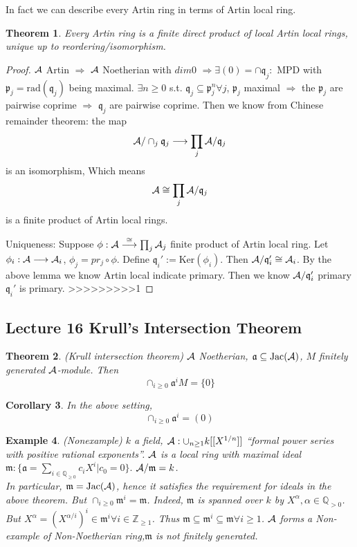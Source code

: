 \documentclass[11pt]{article}
\newtheorem{thm}{Theorem}[section]
\newtheorem{cor}[thm]{Corollary}
\newtheorem{ex}[thm]{Example}
\newcommand{\intg}{\mathbb Z}
\newcommand{\ratl}{\mathbb Q}
\newcommand{\sca}{{\mathfrak a}}
\newcommand{\scm}{{\mathfrak m}}
\newcommand{\scp}{{\mathfrak p}}
\newcommand{\scq}{\mathfrak q}
\newcommand{\cala}{{\cal A}}
\newcommand{\Lrta}{\Longrightarrow}
\newcommand{\lrta}{\longrightarrow}
\begin{document}
In fact we can describe every Artin ring in terms of Artin local ring.
\begin{thm}\label{thm:Artin_product_of_Artin_local}
Every Artin ring is a finite direct product of local Artin local rings, unique up to reordering/isomorphism.
\end{thm}
\begin{proof}
$\cala$ Artin $\Lrta $ $\cala$ Noetherian with $dim 0$ $\Lrta\exists (0)=\cap\scq_j:$ MPD with $\scp_j=\text{rad}(\scq_j)$ being maximal. $\exists n\geq 0$  s.t. $\scq_j\subseteq \scp_j^n\forall j$, $\scp_j$ maximal $\Lrta$ the $\scp_j$ are pairwise coprime $\Lrta$ $\scq_j$ are pairwise coprime. Then we know from Chinese remainder theorem:
the map
$$
\cala/\cap_j\scq_j\lrta \prod_j \cala/\scq_j
$$
 is an isomorphism,
 Which means 
 $$
\cala\cong\prod_j \cala/\scq_j
 $$
is a finite product of Artin local rings.

Uniqueness: Suppose $\phi:\cala\overset{\cong}{\lrta}\prod_j\cala_j$ finite product of Artin local ring. Let $\phi_i:\cala\lrta \cala_i$, $\phi_j=pr_j\circ\phi$. Define $\scq_i':=\text{Ker}(\phi_i)$. Then $\cala/\scq'_i\cong \cala_i$. By the above lemma we know Artin local indicate primary. Then we know $\cala/\scq_i'$ primary $\scq_i'$ is primary.
>>>>>>>>>1
\end{proof}

\subsection{Lecture 16 Krull's Intersection Theorem}

\begin{thm}\label{thm:Krull_intersection}(Krull intersection theorem)
$\cala$ Noetherian, $\sca\subseteq \text{Jac}(\cala)$, $M$ finitely generated $\cala$-module.
Then
$$
\cap_{i\geq 0}\sca^i M=\{0\}
$$
\end{thm}
\begin{cor}
In the above setting, 
$$
\cap_{i\geq 0}\sca^i=(0)
$$
\end{cor}
\begin{ex}
(Nonexample) $k$ a field, $\cala:\cup_{n\geq 1}k[[X^{1/n}]]$ ``formal power series with positive rational exponents''. $\cala$ is a local ring with maximal ideal $\scm:\{\sca=\sum_{i\in\ratl_{\geq 0}}c_i X^i|c_0=0\}.$ $\cala/\scm=k$.\\
In particular, $\scm=\text{Jac}(\cala)$, hence it satisfies the requirement for ideals in the above theorem. But $\cap_{i\geq 0}\scm^i=\scm$. Indeed, $\scm$ is spanned over $k$  by $X^\alpha,\alpha\in\ratl_{>0}$. But $X^\alpha=(X^{\alpha/i})^i\in\scm^i\forall i\in\intg_{\geq 1}$. Thus $\scm\subseteq \scm^i\subseteq \scm\forall i\geq 1$. $\cala$ forms a Non-example of Non-Noetherian ring,$\scm$ is not finitely generated. 
\end{ex}
\end{document}
